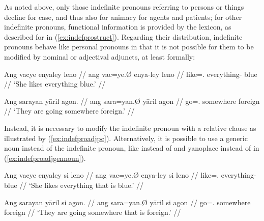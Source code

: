 \begin{morphlex}
\ex\label{ex:indefpromorphlex}
\xe
\end{morphlex}

As noted above, only those indefinite pronouns referring to persons or things
decline for case, and thus also for animacy for agents and patients; for other
indefinite pronouns, functional information is provided by the lexicon, as
described for  in (\ref{ex:indefprostruct}). Regarding their
distribution, indefinite pronouns behave like personal pronouns in that it is
not possible for them to be modified by nominal or adjectival adjuncts, at
least formally:

\pex\label{ex:indefproadj}
\a\ljudge*\begingl
	\gla Ang vacye enyaley leno //
	\glb ang vac=ye.Ø enya-ley leno //
	\glc \AgtT{} like=\TsgF{}.\Top{} everything-\PargI{} blue //
	\glft `She likes everything blue.' //
\endgl

\a\ljudge*\begingl
	\gla Ang sarayan yāril agon. //
	\glb ang sara=yan.Ø yāril agon //
	\glc \AgtT{} go=\TplM{}.\Top{} somewhere foreign //
	\glft `They are going somewhere foreign.' //
\endgl
\xe

Instead, it is necessary to modify the indefinite pronoun with a relative
clause as illustrated by (\ref{ex:indefproadjpc}). Alternatively, it is
possible to use a generic noun instead of the indefinite pronoun, like
 instead of  and 
{yano}{place} instead of  in
(\ref{ex:indefproadjgennoun}).

\pex\label{ex:indefproadjpc}
\a\begingl
	\gla Ang vacye enyaley si leno //
	\glb ang vac=ye.Ø enya-ley si leno //
	\glc \AgtT{} like=\TsgF{}.\Top{} everything-\PargI{} \Rel{} blue //
	\glft `She likes everything that is blue.' //
\endgl

\a\begingl
	\gla Ang sarayan yāril si agon. //
	\glb ang sara=yan.Ø yāril si agon //
	\glc \AgtT{} go=\TplM{}.\Top{} somewhere \Rel{} foreign //
	\glft `They are going somewhere that is foreign.' //
\endgl
\xe

